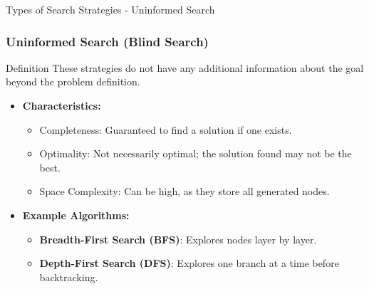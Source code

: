 \documentclass[aspectratio=169]{beamer}
\begin{document}
\begin{frame}[fragile]{Types of Search Strategies - Uninformed Search}
    \frametitle{Uninformed Search (Blind Search)}
    \begin{block}{Definition}
        These strategies do not have any additional information about the goal beyond the problem definition.
    \end{block}
    
    \begin{itemize}
        \item \textbf{Characteristics:}
        \begin{itemize}
            \item Completeness: Guaranteed to find a solution if one exists.
            \item Optimality: Not necessarily optimal; the solution found may not be the best.
            \item Space Complexity: Can be high, as they store all generated nodes.
        \end{itemize}
        
        \item \textbf{Example Algorithms:}
        \begin{itemize}
            \item \textbf{Breadth-First Search (BFS)}: Explores nodes layer by layer.
            \item \textbf{Depth-First Search (DFS)}: Explores one branch at a time before backtracking.
        \end{itemize}
    \end{itemize}
\end{frame}
\end{document}
